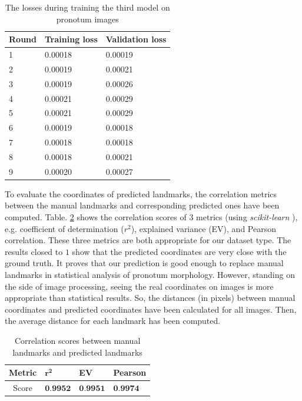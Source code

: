 \documentclass[review]{elsarticle}
\begin{document}
\begin{table}[h!]
	\centering
	\begin{tabular}{l l l}
	Round & Training loss & Validation loss \\ \hline
	1 & 0.00018 & 0.00019  \\ \hline
	2 & 0.00019 & 0.00021 \\ \hline
	3 & 0.00019 & 0.00026 \\ \hline
	4 & 0.00021 & 0.00029 \\ \hline
	5 & 0.00021 & 0.00029 \\ \hline
	6 & 0.00019 & 0.00018 \\ \hline
	7 & 0.00018 & 0.00018 \\ \hline
	8 & 0.00018 & 0.00021 \\ \hline
	9 & 0.00020 & 0.00027 \\ \hline
	\end{tabular}
	\caption{\small{The losses during training the third model on pronotum images}}
	\label{tbltrainingloss}
\end{table}

To evaluate the coordinates of predicted landmarks, the correlation metrics between the manual landmarks and corresponding predicted ones have been computed. Table. \ref{tblcorrelation} shows the correlation scores of $3$ metrics (using \textit{scikit-learn} \cite{pedregosa2011scikit}), e.g. coefficient of determination ($r^2$), explained variance (EV), and Pearson correlation. These three metrics are both appropriate for our dataset type. The results closed to $1$ show that the predicted coordinates are very close with the ground truth. It proves that our prediction is good enough to replace manual landmarks in statistical analysis of pronotum morphology. However, standing on the side of image processing, seeing the real coordinates on images is more appropriate than statistical results. So, the distances (in pixels) between manual coordinates and predicted coordinates have been calculated for all images. Then, the average distance for each landmark has been computed.

\begin{table}[htbp]
	\centering
	\begin{tabular}{|c|p{2cm}|p{2cm}|p{2cm}|}
		\hline
		Metric & $\mathbf{r^{2}}$ & \textbf{EV} & \textbf{Pearson} \\ \hline
		Score & $\textbf{0.9952}$ & $\textbf{0.9951}$ & $\textbf{0.9974}$ \\\hline
	\end{tabular}
	\caption{Correlation scores between manual landmarks and predicted landmarks}
	\label{tblcorrelation}
\end{table}
\end{document}
